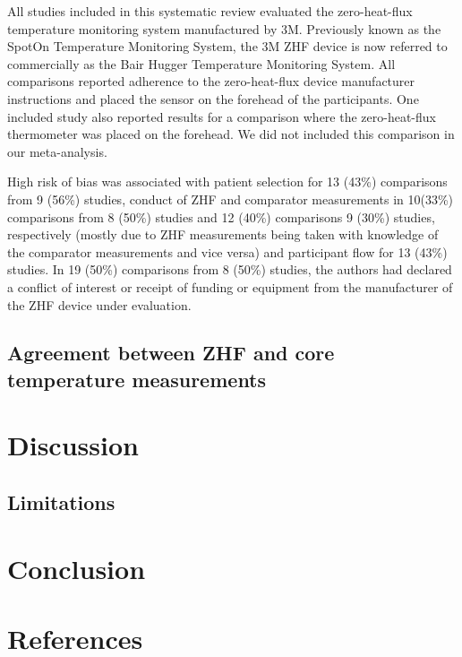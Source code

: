 \documentclass[smallextended]{svjour3}       %
\begin{document}
All studies included in this systematic review evaluated the
zero-heat-flux temperature monitoring system manufactured by 3M.
Previously known as the SpotOn Temperature Monitoring System, the 3M ZHF
device is now referred to commercially as the Bair Hugger Temperature
Monitoring System. All comparisons reported adherence to the
zero-heat-flux device manufacturer instructions and placed the sensor on
the forehead of the participants. One included study also reported
results for a comparison where the zero-heat-flux thermometer was placed
on the forehead. We did not included this comparison in our
meta-analysis.

High risk of bias was associated with patient selection for 13 (43\%)
comparisons from 9 (56\%) studies, conduct of ZHF and comparator
measurements in 10(33\%) comparisons from 8 (50\%) studies and 12 (40\%)
comparisons 9 (30\%) studies, respectively (mostly due to ZHF
measurements being taken with knowledge of the comparator measurements
and vice versa) and participant flow for 13 (43\%) studies. In 19 (50\%)
comparisons from 8 (50\%) studies, the authors had declared a conflict
of interest or receipt of funding or equipment from the manufacturer of
the ZHF device under evaluation.

\hypertarget{agreement-between-zhf-and-core-temperature-measurements}{%
\subsection{Agreement between ZHF and core temperature
measurements}\label{agreement-between-zhf-and-core-temperature-measurements}}

\hypertarget{discussion}{%
\section{Discussion}\label{discussion}}

\hypertarget{limitations}{%
\subsection{Limitations}\label{limitations}}

\hypertarget{conclusion}{%
\section{Conclusion}\label{conclusion}}

\hypertarget{references}{%
\section*{References}\label{references}}
\end{document}
